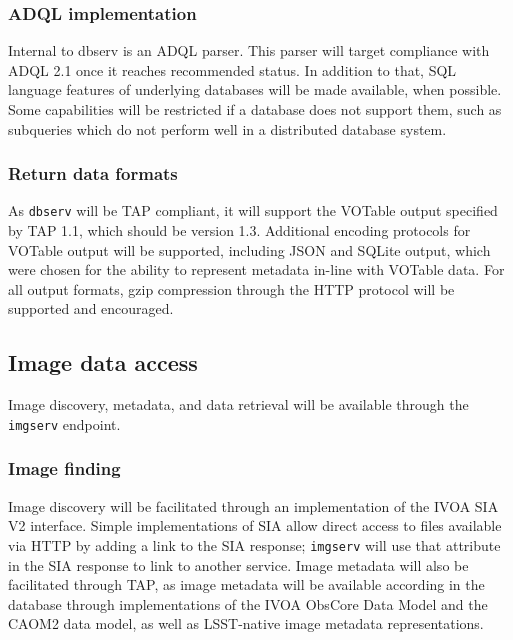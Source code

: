 \subsubsection{ADQL implementation}\label{adql-implementation}

Internal to dbserv is an ADQL parser. This parser will target compliance with
ADQL 2.1 once it reaches recommended status.  In addition to that, SQL language
features of underlying databases will be made available, when possible.  Some
capabilities will be restricted if a database does not support them, such as
subqueries which do not perform well in a distributed database system.

\subsubsection{Return data formats}\label{return-data-formats}

As \texttt{dbserv} will be TAP compliant, it will support the VOTable output
specified by TAP 1.1, which should be version 1.3. Additional encoding
protocols for VOTable output will be supported, including JSON and SQLite
output, which were chosen for the ability to represent metadata in-line with
VOTable data. For all output formats, gzip compression through the HTTP
protocol will be supported and encouraged.

\subsection{Image data access}\label{image-data-access}

Image discovery, metadata, and data retrieval will be available through
the \texttt{imgserv} endpoint.

\subsubsection{Image finding}\label{image-finding}

Image discovery will be facilitated through an implementation of the IVOA SIA
V2 interface. Simple implementations of SIA allow direct access to files
available via HTTP by adding a link to the SIA response; \texttt{imgserv} will
use that attribute in the SIA response to link to another service. Image
metadata will also be facilitated through TAP, as image metadata will be
available according in the database through implementations of the IVOA ObsCore
Data Model \citep{2011ivoa.spec.1028T} and the CAOM2 data model, as well as LSST-native
image metadata representations.

